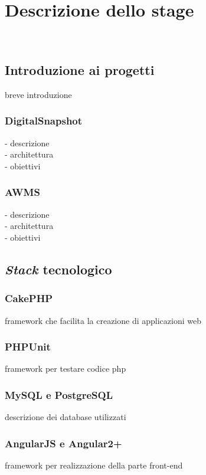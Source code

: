 \newpage
\chapter{Descrizione dello stage}
\label{cap:descrizione-stage}

\\

\section{Introduzione ai progetti}
breve introduzione
\subsection{DigitalSnapshot}
- descrizione\\
- architettura\\
- obiettivi\\
\subsection{AWMS}
- descrizione\\
- architettura\\
- obiettivi\\
\section{\textit{Stack} tecnologico}
\subsection{CakePHP}
framework che facilita la creazione di applicazioni web
\subsection{PHPUnit}
framework per testare codice php
\subsection{MySQL e PostgreSQL}
descrizione dei database utilizzati
\subsection{AngularJS e Angular2+}
framework per realizzazione della parte front-end
